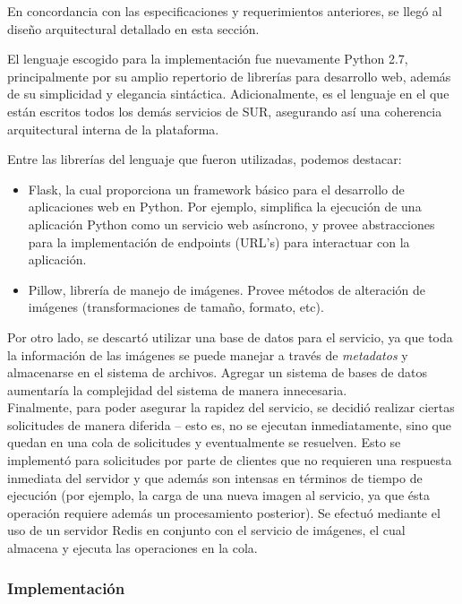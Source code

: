 \documentclass[11pt,letterpaper]{article}
\begin{document}
En concordancia con las especificaciones y requerimientos anteriores, se llegó al diseño arquitectural detallado en esta sección.

El lenguaje escogido para la implementación fue nuevamente Python 2.7, principalmente por su amplio repertorio de librerías para desarrollo web, además de su simplicidad y elegancia sintáctica. Adicionalmente, es el lenguaje en el que están escritos todos los demás servicios de SUR, asegurando así una coherencia arquitectural interna de la plataforma.

Entre las librerías del lenguaje que fueron utilizadas, podemos destacar:
\begin{itemize}
    \item Flask\cite{flask}, la cual proporciona un framework básico para el desarrollo de aplicaciones web en Python. Por ejemplo, simplifica la ejecución de una aplicación Python como un servicio web asíncrono, y provee abstracciones para la implementación de endpoints (URL's) para interactuar con la aplicación.
    \item Pillow\cite{pillow}, librería de manejo de imágenes. Provee métodos de alteración de imágenes (transformaciones de tamaño, formato, etc).
\end{itemize}

Por otro lado, se descartó utilizar una base de datos para el servicio, ya que toda la información de las imágenes se puede manejar a través de \emph{metadatos} y almacenarse en el sistema de archivos. Agregar un sistema de bases de datos aumentaría la complejidad del sistema de manera innecesaria.\\

Finalmente, para poder asegurar la rapidez del servicio, se decidió realizar ciertas solicitudes de manera diferida -- esto es, no se ejecutan inmediatamente, sino que quedan en una cola de solicitudes y eventualmente se resuelven. Esto se implementó para solicitudes por parte de clientes que no requieren una respuesta inmediata del servidor y que además son intensas en términos de tiempo de ejecución (por ejemplo, la carga de una nueva imagen al servicio, ya que ésta operación requiere además un procesamiento posterior). Se efectuó mediante el uso de un servidor Redis en conjunto con el servicio de imágenes, el cual almacena y ejecuta las operaciones en la cola.
\newpage
\subsubsection{Implementación}
\end{document}

